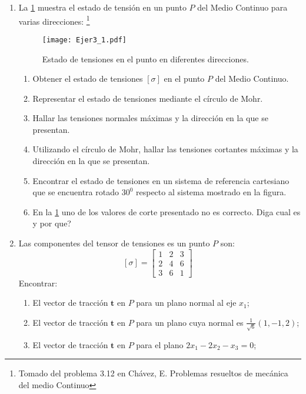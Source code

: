\documentclass[../notas medios.tex]{subfiles}
\begin{document}
\begin{enumerate}
\item \label{punto01} La \cref{figura2:mala} muestra el estado de tensión
en un punto $P$ del Medio Continuo para varias direcciones: \footnote{Tomado del problema 3.12 en Chávez, E. Problemas resueltos de mecánica del medio Continuo}

\begin{figure}[H]
	\centering
	\texttt{[image: Ejer3\_1.pdf]}
	\caption{Estado de tensiones en el punto en diferentes direcciones.}
	\label{figura2:mala}
\end{figure}
\begin{enumerate}
	\item Obtener el estado de tensiones $[\sigma]$ en el punto $P$ del Medio
	Continuo.
	\item Representar el estado de tensiones mediante el c\'irculo de Mohr.
	\item Hallar las tensiones normales m\'aximas y la direcci\'on en la que se presentan.
	\item Utilizando el círculo de Mohr, hallar las tensiones cortantes m\'aximas y la direcci\'on en la que se presentan.
	\item Encontrar el estado de tensiones en un sistema de referencia cartesiano que se encuentra rotado $30^{0}$ respecto al sistema mostrado en la figura.
	\item En la  \cref{figura2:mala} uno de los valores de corte presentado no es correcto. \textquestiondown  Diga cual es y por que?
\end{enumerate}

\item \label{punto02} Las componentes del tensor de tensiones es un punto $P$
son:
		\[{[\sigma]} = \left[ \begin{array}{ccc}
		1 & 2 & 3 \\ 
		2 & 4 & 6 \\ 
		3 & 6 & 1
		\end{array}  \right] \enspace\]
%
Encontrar:
%
\begin{enumerate}
	\item El vector de tracci\'on $\mathbf{t}$ en $P$ para un plano normal al eje $x_1$;
	\item El vector de tracci\'on $\mathbf{t}$ en $P$ para un plano cuya normal es $\frac{1}{\sqrt{6}}(1,-1,2)$;
	\item El vector de tracci\'on $\mathbf{t}$ en $P$ para el plano $2x_1 - 2x_2 - x_3 = 0$;
\end{enumerate}


\end{enumerate}
\end{document}
